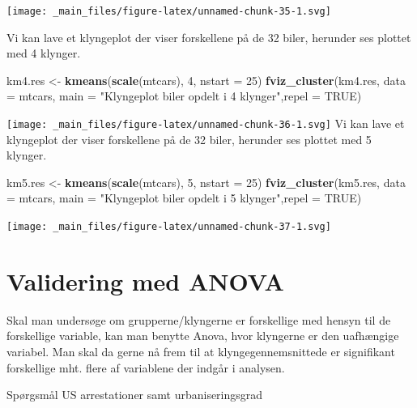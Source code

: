 \documentclass[]{book}
\newenvironment{Shaded}{\begin{snugshade}}{\end{snugshade}}
\newcommand{\DataTypeTok}[1]{\textcolor[rgb]{0.13,0.29,0.53}{#1}}
\newcommand{\DecValTok}[1]{\textcolor[rgb]{0.00,0.00,0.81}{#1}}
\newcommand{\KeywordTok}[1]{\textcolor[rgb]{0.13,0.29,0.53}{\textbf{#1}}}
\newcommand{\NormalTok}[1]{#1}
\newcommand{\OtherTok}[1]{\textcolor[rgb]{0.56,0.35,0.01}{#1}}
\newcommand{\StringTok}[1]{\textcolor[rgb]{0.31,0.60,0.02}{#1}}
\begin{document}
\texttt{[image: \_main\_files/figure-latex/unnamed-chunk-35-1.svg]}

Vi kan lave et klyngeplot der viser forskellene på de 32 biler, herunder ses plottet med 4 klynger.

\begin{Shaded}
\begin{Highlighting}[]
\NormalTok{km4.res <-}\StringTok{ }\KeywordTok{kmeans}\NormalTok{(}\KeywordTok{scale}\NormalTok{(mtcars), }\DecValTok{4}\NormalTok{, }\DataTypeTok{nstart =} \DecValTok{25}\NormalTok{)}
\KeywordTok{fviz_cluster}\NormalTok{(km4.res, }\DataTypeTok{data =}\NormalTok{ mtcars, }\DataTypeTok{main =} \StringTok{"Klyngeplot biler opdelt i 4 klynger"}\NormalTok{,}\DataTypeTok{repel =} \OtherTok{TRUE}\NormalTok{)}
\end{Highlighting}
\end{Shaded}

\texttt{[image: \_main\_files/figure-latex/unnamed-chunk-36-1.svg]}
Vi kan lave et klyngeplot der viser forskellene på de 32 biler, herunder ses plottet med 5 klynger.

\begin{Shaded}
\begin{Highlighting}[]
\NormalTok{km5.res <-}\StringTok{ }\KeywordTok{kmeans}\NormalTok{(}\KeywordTok{scale}\NormalTok{(mtcars), }\DecValTok{5}\NormalTok{, }\DataTypeTok{nstart =} \DecValTok{25}\NormalTok{)}
\KeywordTok{fviz_cluster}\NormalTok{(km5.res, }\DataTypeTok{data =}\NormalTok{ mtcars, }\DataTypeTok{main =} \StringTok{"Klyngeplot biler opdelt i 5 klynger"}\NormalTok{,}\DataTypeTok{repel =} \OtherTok{TRUE}\NormalTok{)}
\end{Highlighting}
\end{Shaded}

\texttt{[image: \_main\_files/figure-latex/unnamed-chunk-37-1.svg]}

\hypertarget{validering-med-anova}{%
\section{Validering med ANOVA}\label{validering-med-anova}}

Skal man undersøge om grupperne/klyngerne er forskellige med hensyn til de forskellige variable, kan man benytte Anova, hvor klyngerne er den uafhængige variabel. Man skal da gerne nå frem til at klyngegennemsnittede er signifikant forskellige mht. flere af variablene der indgår i analysen.

Spørgsmål US arrestationer samt urbaniseringsgrad
\end{document}
